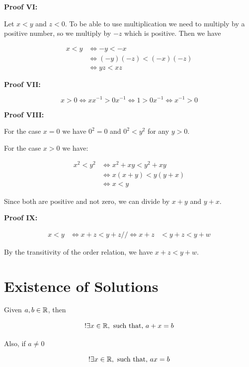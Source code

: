 \QED

\textbf{Proof VI:}

Let \(x < y\) and \(z < 0\). To be able to use multiplication we need to multiply by a positive number, so we multiply by \(-z\) which is positive.
Then we have

\begin{align*}
	x < y & \iff -y < -x             \\
	      & \iff (-y)(-z) < (-x)(-z) \\
	      & \iff yz < xz
\end{align*}

\QED

\textbf{Proof VII:}

\[
	x > 0 \iff x x^{-1} > 0 x^{-1} \iff 1 > 0 x^{-1} \iff x^{-1} > 0
\]

\QED

\textbf{Proof VIII:}

For the case \(x = 0\) we have \(0^2 = 0\) and \(0^2 < y^2\) for any \(y > 0\).

For the case \(x > 0\) we have:

\begin{align*}
	x^2 < y^2 & \iff x^2 +xy < y^2 + xy  \\
	          & \iff x(x + y) < y(y + x) \\
	          & \iff x < y
\end{align*}

Since both are positive and not zero, we can divide by \(x + y\) and \(y + x\).

\QED

\textbf{Proof IX:}

\begin{align*}
	x < y      & \iff x + z < y + z //
	\iff x + z & < y + z < y + w
\end{align*}

By the transitivity of the order relation, we have \(x + z < y + w\).

\QED

\section{Existence of Solutions}

Given \(a,b \in \mathbb{R}\), then

\[
	!\exists x \in \mathbb{R}, \text{ such that, } a + x = b
\]

Also, if \(a \ne 0\)

\[
	!\exists x \in \mathbb{R}, \text{ such that, } ax = b
\]

